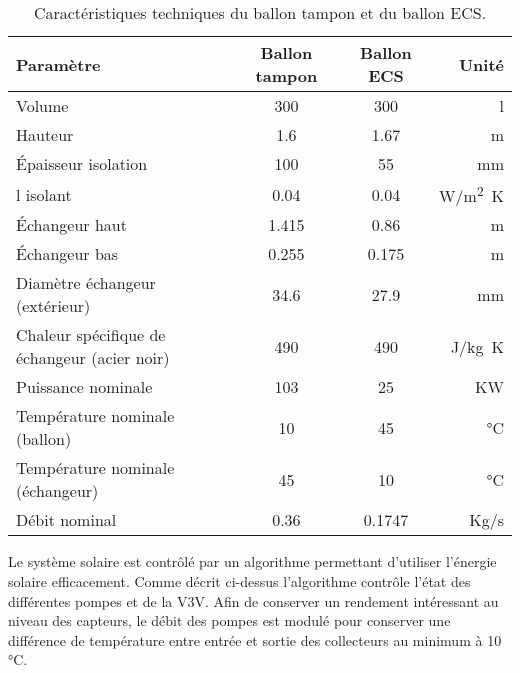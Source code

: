 \begin{table}
\centering
\begin{tabular}{l*{2}{c}r}
    \toprule
    Paramètre & Ballon tampon & Ballon ECS & Unité\\
    \midrule
    Volume                                       & 300   & 300    & \si{l}              \\
    Hauteur                                      & 1.6   & 1.67   & \si{m}              \\
    Épaisseur isolation                          & 100   & 55     & \si{mm}             \\
    \textgreek{l} isolant                        & 0.04  & 0.04   & \si{W/m^{2}.K}      \\
    Échangeur haut                               & 1.415 & 0.86   & \si{m}              \\
    Échangeur bas                                & 0.255 & 0.175  & \si{m}              \\
    Diamètre échangeur (extérieur)               & 34.6  & 27.9   & \si{mm}             \\
    Chaleur spécifique de échangeur (acier noir) & 490   & 490    & \si{J/kg.K}         \\
    Puissance nominale                           & 103   & 25     & \si{KW}             \\
    Température nominale (ballon)                & 10    & 45     & \si{\degreeCelsius} \\
    Température nominale (échangeur)             & 45    & 10     & \si{\degreeCelsius} \\
    Débit nominal                                & 0.36  & 0.1747 & \si{Kg/s}           \\
    \bottomrule
\end{tabular}
\caption{Caractéristiques techniques du ballon tampon et du ballon ECS.
         \label{tab:tanks_specs}}
\end{table}


Le système solaire est contrôlé par un algorithme permettant d’utiliser l’énergie
solaire efficacement. Comme décrit ci-dessus l’algorithme contrôle l’état des
différentes pompes et de la V3V. Afin de conserver un rendement intéressant au
niveau des capteurs, le débit des pompes est modulé pour conserver une différence
de température entre entrée et sortie des collecteurs au minimum à 10\,\si{\degreeCelsius}.

